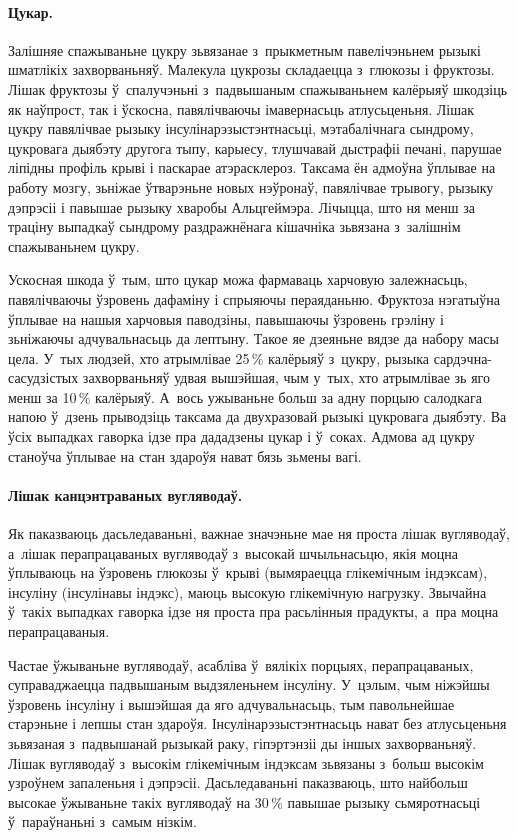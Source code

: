 \paragraph{Цукар.}
Залішняе спажываньне цукру зьвязанае з~прыкметным павелічэньнем рызыкі шматлікіх захворваньняў. Малекула цукрозы складаецца з~глюкозы і фруктозы. Лішак фруктозы ў~спалучэньні з~падвышаным спажываньнем калёрыяў шкодзіць як наўпрост, так і ўскосна, павялічваючы імавернасьць атлусьценьня. Лішак цукру павялічвае рызыку інсулінарэзыстэнтнасьці, мэтабалічнага сындрому, цукровага дыябэту другога тыпу, карыесу, тлушчавай дыстрафіі печані, парушае ліпідны профіль крыві і паскарае атэрасклероз. Таксама ён адмоўна ўплывае на работу мозгу, зьніжае ўтварэньне новых нэўронаў, павялічвае трывогу, рызыку дэпрэсіі і павышае рызыку хваробы Альцгеймэра. Лічыцца, што ня менш за траціну выпадкаў сындрому раздражнёнага кішачніка зьвязана з~залішнім спажываньнем цукру.

Ускосная шкода ў~тым, што цукар можа фармаваць харчовую залежнасьць, павялічваючы ўзровень дафаміну і спрыяючы пераяданьню. Фруктоза нэгатыўна ўплывае на нашыя харчовыя паводзіны, павышаючы ўзровень грэліну і зьніжаючы адчувальнасьць да лептыну. Такое яе дзеяньне вядзе да набору масы цела. У~тых людзей, хто атрымлівае 25\,\% калёрыяў з~цукру, рызыка сардэчна-сасудзістых захворваньняў удвая вышэйшая, чым у~тых, хто атрымлівае зь яго менш за 10\,\% калёрыяў. А~вось ужываньне больш за адну порцыю салодкага напою ў~дзень прыводзіць таксама да двухразовай рызыкі цукровага дыябэту. Ва ўсіх выпадках гаворка ідзе пра дададзены цукар і ў~соках. Адмова ад цукру станоўча ўплывае на стан здароўя нават бязь зьмены вагі.


\paragraph{Лішак канцэнтраваных вугляводаў.}
Як паказваюць дасьледаваньні, важнае значэньне мае ня проста лішак вугляводаў, а~лішак перапрацаваных вугляводаў з~высокай шчыльнасьцю, якія моцна ўплываюць на ўзровень глюкозы ў~крыві (вымяраецца глікемічным індэксам), інсуліну (інсулінавы індэкс), маюць высокую глікемічную нагрузку. Звычайна ў~такіх выпадках гаворка ідзе ня проста пра расьлінныя прадукты, а~пра моцна перапрацаваныя.

Частае ўжываньне вугляводаў, асабліва ў~вялікіх порцыях, перапрацаваных, суправаджаецца падвышаным выдзяленьнем інсуліну. У~цэлым, чым ніжэйшы ўзровень інсуліну і вышэйшая да яго адчувальнасьць, тым павольнейшае старэньне і лепшы стан здароўя. Інсулінарэзыстэнтнасьць нават без атлусьценьня зьвязаная з~падвышанай рызыкай раку, гіпэртэнзіі ды іншых захворваньняў. Лішак вугляводаў з~высокім глікемічным індэксам зьвязаны з~больш высокім узроўнем запаленьня і дэпрэсіі. Дасьледаваньні паказваюць, што найбольш высокае ўжываньне такіх вугляводаў на 30\,\% павышае рызыку сьмяротнасьці ў~параўнаньні з~самым нізкім.

